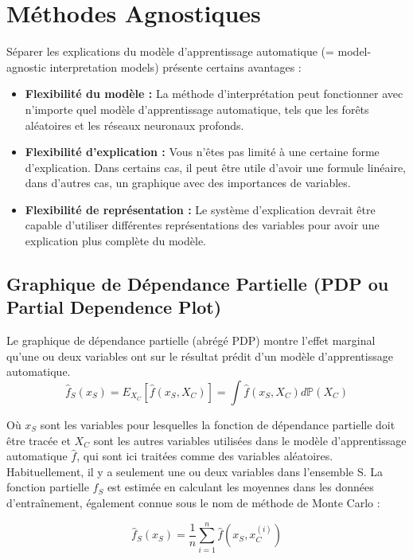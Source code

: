 \section{Méthodes Agnostiques}

Séparer les explications du modèle d'apprentissage automatique (= model-agnostic interpretation models) présente certains avantages :

\begin{itemize}
    \item \textbf{Flexibilité du modèle :} La méthode d'interprétation peut fonctionner avec n'importe quel modèle d'apprentissage automatique, tels que les forêts aléatoires et les réseaux neuronaux profonds.
    
    \item \textbf{Flexibilité d'explication :} Vous n'êtes pas limité à une certaine forme d'explication. Dans certains cas, il peut être utile d'avoir une formule linéaire, dans d'autres cas, un graphique avec des importances de variables.
    
    \item \textbf{Flexibilité de représentation :} Le système d'explication devrait être capable d'utiliser différentes représentations des variables pour avoir une explication plus complète du modèle. 
\end{itemize}

\subsection{Graphique de Dépendance Partielle (PDP ou Partial Dependence Plot)}
Le graphique de dépendance partielle (abrégé PDP) montre l'effet marginal qu'une ou deux variables ont sur le résultat prédit d'un modèle d'apprentissage automatique.
\[ \hat{f}_S(x_S) = E_{X_C}\left[\hat{f}(x_S,X_C)\right] = \int \hat{f}(x_S,X_C) d\mathbb{P}(X_C) \]

Où \( x_S \) sont les variables pour lesquelles la fonction de dépendance partielle doit être tracée et \( X_C \) sont les autres variables utilisées dans le modèle d'apprentissage automatique \( \hat{f} \), qui sont ici traitées comme des variables aléatoires. Habituellement, il y a seulement une ou deux variables dans l'ensemble S.
La fonction partielle \( \hat{f}_S \) est estimée en calculant les moyennes dans les données d'entraînement, également connue sous le nom de méthode de Monte Carlo :

\[ \hat{f}_S(x_S) = \frac{1}{n} \sum_{i=1}^n \hat{f}(x_S,x^{(i)}_{C}) \]

